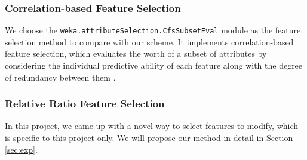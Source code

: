 \documentclass[11pt]{article}
\begin{document}
\subsubsection{Correlation-based Feature Selection}
We choose the \texttt{weka.attributeSelection.CfsSubsetEval} module as the feature selection method to compare with our scheme. It implements correlation-based feature selection, which evaluates the worth of a subset of attributes by considering the individual predictive ability of each feature along with the degree of redundancy between them \cite{hall1999correlation}.

\subsubsection{Relative Ratio Feature Selection}
In this project, we came up with a novel way to select features to modify, which is specific to this project only. We will propose our method in detail in Section \ref{sec:exp}.



\end{document}
